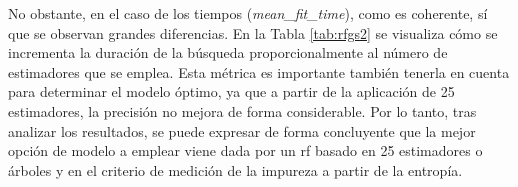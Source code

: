\vspace{3mm}

No obstante, en el caso de los tiempos (\textit{mean\_fit\_time}), como es coherente, sí que se observan grandes diferencias. En la Tabla \ref{tab:rfgs2} se visualiza cómo se incrementa la duración de la búsqueda proporcionalmente al número de estimadores que se emplea. Esta métrica es importante también tenerla en cuenta para determinar el modelo óptimo, ya que a partir de la aplicación de 25 estimadores, la precisión no mejora de forma considerable. Por lo tanto, tras analizar los resultados, se puede expresar de forma concluyente que la mejor opción de modelo a emplear viene dada por un \gls{rf} basado en 25 estimadores o árboles y en el criterio de medición de la impureza a partir de la entropía.

\vspace{3mm}

